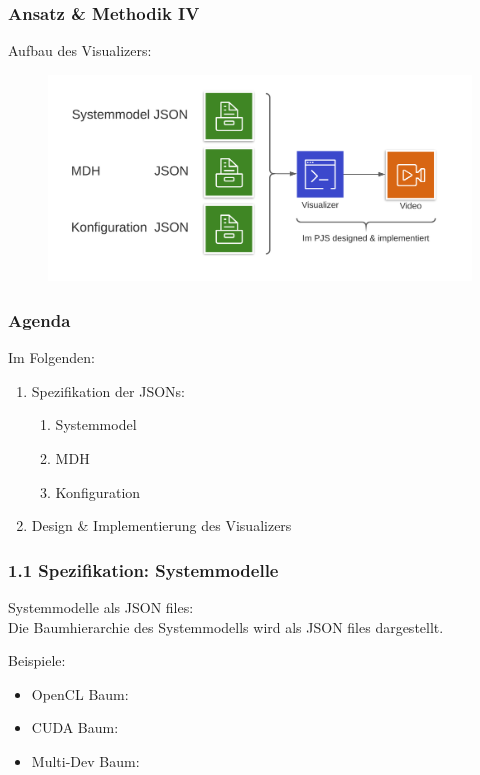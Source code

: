 \documentclass{presentation}
\begin{document}
\begin{frame}
	\frametitle{Ansatz \& Methodik IV}
	Aufbau des Visualizers:
	
	\begin{figure}
		\includegraphics[scale=0.5]{images/visualizer_aufbau.png}
	\end{figure}
\end{frame}

\begin{frame}
	\frametitle{Agenda}
	Im Folgenden:
	
	\begin{enumerate}
		\item Spezifikation der JSONs:
		\begin{enumerate}
			\item Systemmodel
			\item MDH
			\item Konfiguration
		\end{enumerate}
		\item Design \& Implementierung des Visualizers
	\end{enumerate}
\end{frame}

\begin{frame}[allowframebreaks]
	\frametitle{1.1 Spezifikation: Systemmodelle}
	Systemmodelle als JSON files:\\
	Die Baumhierarchie des Systemmodells wird als JSON files dargestellt.
	
	\bigskip
	
	Beispiele:
	\begin{itemize}
		\item OpenCL Baum:
		
		\framebreak
		\item CUDA Baum:
		
		\framebreak
		\item Multi-Dev Baum:
		
	\end{itemize}
\end{frame}
\end{document}
